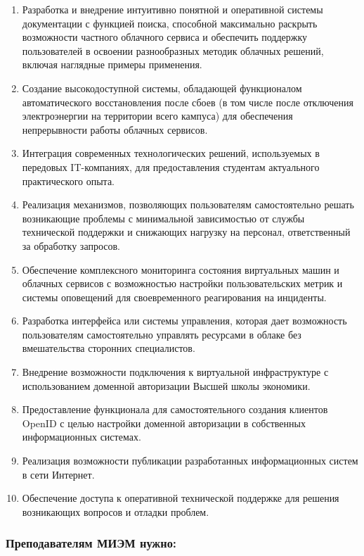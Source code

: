 \documentclass[14pt, a4paper]{extarticle}
\begin{document}
\begin{enumerate}

\item Разработка и внедрение интуитивно понятной и оперативной системы документации с функцией поиска, способной максимально раскрыть возможности частного облачного сервиса и обеспечить поддержку пользователей в освоении разнообразных методик облачных решений, включая наглядные примеры применения.
\item Создание высокодоступной системы, обладающей функционалом автоматического восстановления после сбоев (в том числе после отключения электроэнергии на территории всего кампуса) для обеспечения непрерывности работы облачных сервисов.
\item Интеграция современных технологических решений, используемых в передовых IT-компаниях, для предоставления студентам актуального практического опыта.
\item Реализация механизмов, позволяющих пользователям самостоятельно решать возникающие проблемы с минимальной зависимостью от службы технической поддержки и снижающих нагрузку на персонал, ответственный за обработку запросов.
\item Обеспечение комплексного мониторинга состояния виртуальных машин и облачных сервисов с возможностью настройки пользовательских метрик и системы оповещений для своевременного реагирования на инциденты.
\item Разработка интерфейса или системы управления, которая дает возможность пользователям самостоятельно управлять ресурсами в облаке без вмешательства сторонних специалистов.
\item Внедрение возможности подключения к виртуальной инфраструктуре с использованием доменной авторизации Высшей школы экономики.
\item Предоставление функционала для самостоятельного создания клиентов OpenID с целью настройки доменной авторизации в собственных информационных системах.
\item Реализация возможности публикации разработанных информационных систем в сети Интернет.
\item Обеспечение доступа к оперативной технической поддержке для решения возникающих вопросов и отладки проблем.

\end{enumerate}

\subsubsection*{Преподавателям МИЭМ нужно:}
\end{document}
